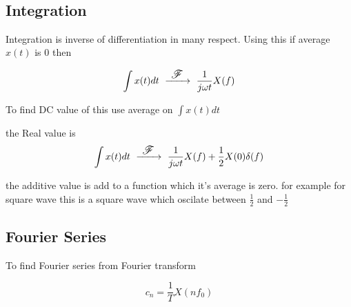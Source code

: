 ~\vspace{-2.5em}
\newcommand{\FourierTransform}{~ \xrightarrow{ \text{\large $~\mathscr{F}~$}} ~}
\subsection{Integration}
Integration is inverse of differentiation in many respect. Using this if average $x(t)$ is 0 then

\begin{equation}
\int x(t) dt \FourierTransform \frac{1}{j \omega t} X(f)
\end{equation}

To find DC value of this use average on $ \int x(t) dt $

the Real value is 
\begin{equation}
\int x(t) dt \FourierTransform \frac{1}{j \omega t} X(f) + \frac{1}{2}X(0)\delta(f)
\end{equation}

the additive value is add to a function which it's average is zero. for example for square wave this is a square wave which oscilate between $\frac{1}{2}$ and $-\frac{1}{2}$

\subsection{Fourier Series}
To find Fourier series from Fourier transform

\begin{equation}
c_n = \frac{1}{T} X(n f_0)
\end{equation}
~\\

